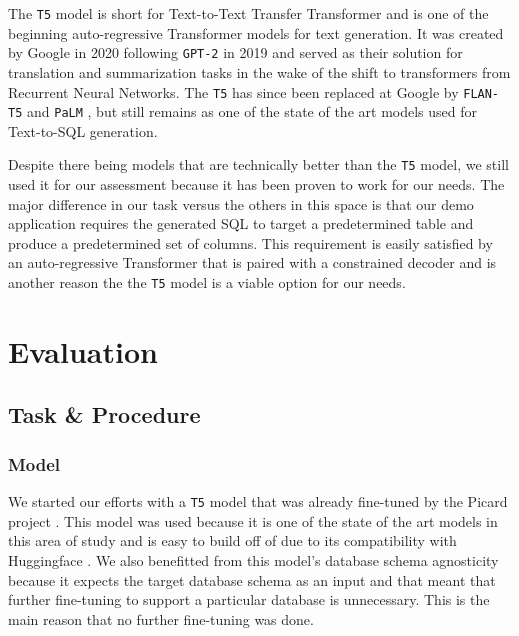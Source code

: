 \documentclass[11pt]{article}
\begin{document}
The \texttt{T5} model \citep{raffel2020exploring} is short for Text-to-Text Transfer Transformer and is one of the beginning auto-regressive Transformer models for text generation. It was created by Google in 2020 following \texttt{GPT-2} in 2019 \citep{radfordgpt2} and served as their solution for translation and summarization tasks in the wake of the shift to transformers from Recurrent Neural Networks. The \texttt{T5} has since been replaced at Google by \texttt{FLAN-T5} \citep{chung2022scaling} and \texttt{PaLM} \citep{chowdhery2022palm}, but still remains as one of the state of the art models used for Text-to-SQL generation.

Despite there being models that are technically better than the \texttt{T5} model, we still used it for our assessment because it has been proven to work for our needs. The major difference in our task versus the others in this space is that our demo application requires the generated SQL to target a predetermined table and produce a predetermined set of columns. This requirement is easily satisfied by an auto-regressive Transformer that is paired with a constrained decoder and is another reason the the \texttt{T5} model is a viable option for our needs.

\section{Evaluation} \label{sec:eval}


\subsection{Task \& Procedure}

\subsubsection{Model}

We started our efforts with a \texttt{T5} model that was already fine-tuned by the Picard project \citep{scholak2021picard}. This model was used because it is one of the state of the art models in this area of study and is easy to build off of due to its compatibility with Huggingface \citep{wolf2020huggingfaces}. We also benefitted from this model's database schema agnosticity because it expects the target database schema as an input and that meant that further fine-tuning to support a particular database is unnecessary. This is the main reason that no further fine-tuning was done.
\end{document}
